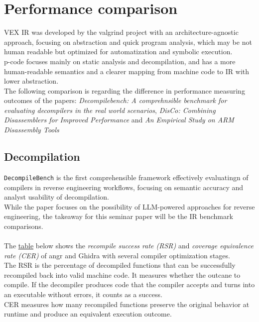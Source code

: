 \documentclass[seminar]{plai}
\begin{document}
\section{Performance comparison}
\label{sec:performance comparison}
VEX IR was developed by the valgrind project with an architecture-agnostic approach, focusing on abstraction and quick program analysis, which may be not human readable but optimized for automatization and symbolic execution.\\
p-code focuses mainly on static analysis and decompilation, and has a more human-readable semantics and a clearer mapping from machine code to IR with lower abstraction.\\
The following comparison is regarding the difference in performance measuring outcomes of the papers:\textit{ Decompilebench: A comprehnsible benchmark for evaluating decompilers in the real world scenarios}\cite{decompileBench-comprehensice-benchmark-for-evaluating-decompilers-in-real-world-scenarios}, \textit{DisCo: Combining Disassemblers for Improved Performance}\cite{DisCo-combining-disassemblers-for-improved-performance} and \textit{An Empirical Study on ARM Disassembly Tools}\cite{an-empirical-study-on-ARM-disassembly-disassembly-tools}

\subsection{Decompilation}
\texttt{DecompileBench} is the first comprehensible framework effectively evaluatingn of compilers in reverse engineering workflows, focusing on semantic accuracy and analyst usability of decompilation.\\
While the paper focuses on the possibility of LLM-powered approaches for reverse engineering, the takeaway for this seminar paper will be the IR benchmark comparisons.\\
\\
The \hyperref[sec:decompileBench-comparison]{table} below shows the \textit{recompile success rate (RSR)} and \textit{coverage equivalence rate (CER)} of angr and Ghidra with several compiler optimization stages.\\
The RSR is the percentage of decompiled functions that can be successfully recompiled back into valid machine code. It measures whether the outcane to compile. If the decompiler produces code that the compiler accepts and turns into an executable without errors, it counts as a success.\\
CER measures how many recompiled functions preserve the original behavior at runtime and produce an equivalent execution outcome.
\end{document}
